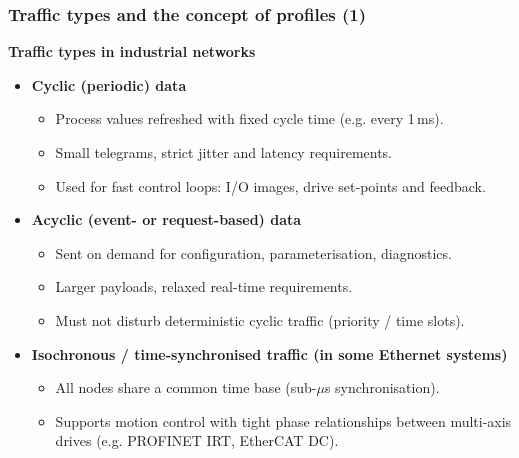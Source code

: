\begin{frame}
	\frametitle{Traffic types and the concept of profiles (1)}
	\small
	\textbf{Traffic types in industrial networks}
	\begin{itemize}
		\item \textbf{Cyclic (periodic) data}
		\begin{itemize}
			\item Process values refreshed with fixed cycle time (e.g. every 1\,ms).
			\item Small telegrams, strict jitter and latency requirements.
			\item Used for fast control loops: I/O images, drive set-points and feedback.
		\end{itemize}
		\item \textbf{Acyclic (event- or request-based) data}
		\begin{itemize}
			\item Sent on demand for configuration, parameterisation, diagnostics.
			\item Larger payloads, relaxed real-time requirements.
			\item Must not disturb deterministic cyclic traffic (priority / time slots).
		\end{itemize}
		\item \textbf{Isochronous / time-synchronised traffic (in some Ethernet systems)}
		\begin{itemize}
			\item All nodes share a common time base (sub-\(\mu\)s synchronisation).
			\item Supports motion control with tight phase relationships
				between multi-axis drives (e.g. PROFINET IRT, EtherCAT DC).
		\end{itemize}
	\end{itemize}
\end{frame}


